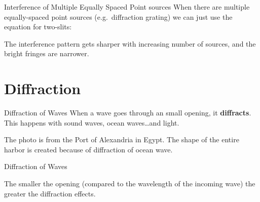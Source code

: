 \documentclass[12pt,compress,aspectratio=169]{beamer}
\begin{document}
\begin{frame}{Interference of Multiple Equally Spaced Point sources}
  When there are multiple equally-spaced point sources (e.g.\ diffraction
  grating) we can just use the equation for two-slits:

  \begin{center}
  \end{center}
  The interference pattern gets sharper with increasing number of sources, and
  the bright fringes are narrower.
\end{frame}




\section{Diffraction}

\begin{frame}{Diffraction of Waves}
  When a wave goes through an small opening, it \textbf{diffracts}. This happens
  with sound waves, ocean waves\ldots and light.
  \begin{center}
  \end{center}
  The photo is from the Port of Alexandria in Egypt. The shape of the entire
  harbor is created because of diffraction of ocean wave.
\end{frame}



\begin{frame}{Diffraction of Waves}
  \begin{center}
  \end{center}
  The smaller the opening (compared to the wavelength of the incoming wave)
  the greater the diffraction effects.
\end{frame}
\end{document}
